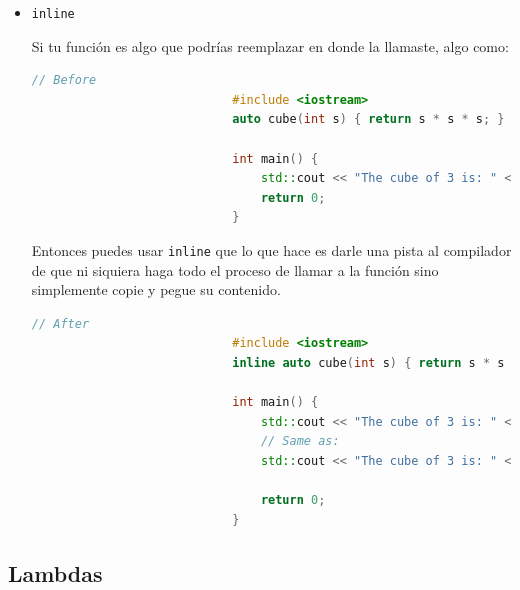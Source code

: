 \documentclass[12pt, fleqn]{report}                             %
\theoremstyle{break}                                            %
\newcommand{\textCode}[1]  { \texttt{#1} }                      %
\begin{document}
                \begin{itemize}
                    \item \textCode{inline}

                        Si tu función es algo que podrías reemplazar en donde la llamaste, 
                        algo como: 
                        \begin{lstlisting}[language=C++, gobble=28]
                            // Before
                            #include <iostream> 
                            auto cube(int s) { return s * s * s; } 
                            
                            int main() { 
                                std::cout << "The cube of 3 is: " << cube(3) << "\n"; 
                                return 0; 
                            }
                        \end{lstlisting}

                        Entonces puedes usar \textCode{inline} que lo que hace es darle una pista al compilador
                        de que ni siquiera haga todo el proceso de llamar a la función sino simplemente copie y
                        pegue su contenido.

                        \begin{lstlisting}[language=C++, gobble=28]
                            // After
                            #include <iostream> 
                            inline auto cube(int s) { return s * s * s; } 
                            
                            int main() { 
                                std::cout << "The cube of 3 is: " << cube(3) << "\n";
                                // Same as:
                                std::cout << "The cube of 3 is: " << 3 * 3 * 3 << "\n";

                                return 0; 
                            }
                        \end{lstlisting}


                \end{itemize}

            
            \clearpage
            \subsection{Lambdas}
\end{document}

